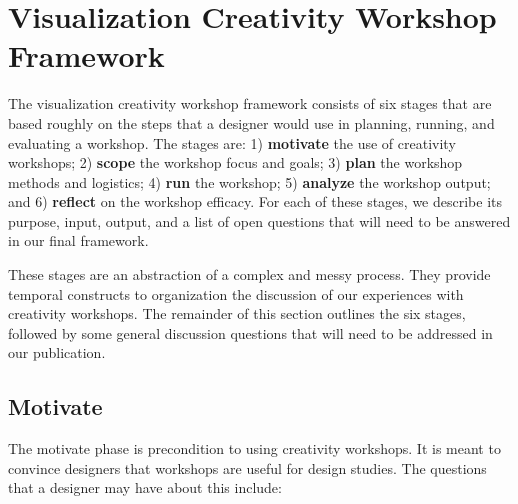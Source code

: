 
\section{Visualization Creativity Workshop Framework}

The visualization creativity workshop framework consists of six stages that are based roughly on the steps that a designer would use in planning, running, and evaluating a workshop. The stages are: 1) {\bf motivate} the use of creativity workshops; 2) {\bf scope} the workshop focus and goals; 3) {\bf plan} the workshop methods and logistics; 4) {\bf run} the workshop; 5) {\bf analyze} the workshop output; and 6) {\bf reflect} on the workshop efficacy. For each of these stages, we describe its purpose, input, output, and a list of open questions that will need to be answered in our final framework.

These stages are an abstraction of a complex and messy process. They provide temporal constructs to organization the discussion of our experiences with creativity workshops. The remainder of this section outlines the six stages, followed by some general discussion questions that will need to be addressed in our publication.

\subsection*{Motivate}

The motivate phase is precondition to using creativity workshops. It is meant to convince designers that workshops are useful for design studies. The questions that a designer may have about this include:

